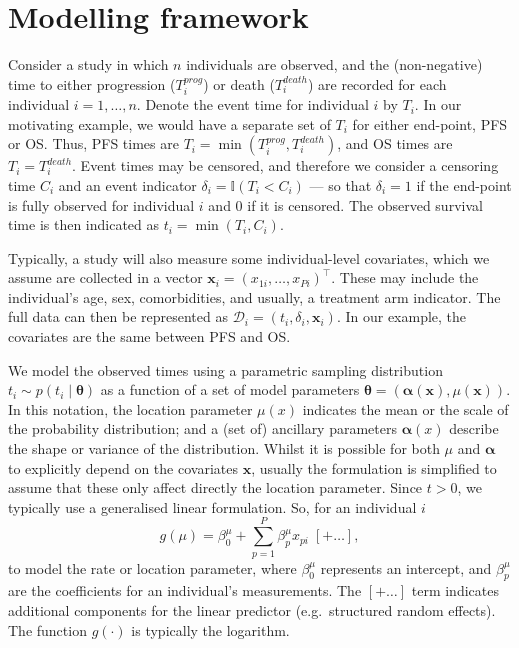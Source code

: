 \documentclass[AMA,STIX1COL]{WileyNJD-v2}
\begin{document}
\section{Modelling framework}\label{sec:methods}
Consider a study in which $n$ individuals are observed, and the (non-negative) time to either progression ($T^{prog}_{i}$) or death ($T^{death}_{i}$) are recorded for each individual $i=1,\ldots,n$.
Denote the event time for individual $i$ by $T_{i}$.
In our motivating example, we would have a separate set of $T_{i}$ for either end-point, PFS or OS.
Thus, PFS times are $T_{i} = \min(T^{prog}_{i}, T^{death}_{i})$, and OS times are $T_{i} = T^{death}_{i}$.
Event times may be censored, and therefore we consider a censoring time $C_{i}$ and an event indicator $\delta_{i} = \mathbb{I}(T_{i} < C_{i})$
--- so that $\delta_{i} = 1$ if the end-point is fully observed for individual $i$ and 0 if it is censored.
The observed survival time is then indicated as $t_{i} = \min(T_{i}, C_{i})$.

Typically, a study will also measure some individual-level covariates, which we assume are collected in a vector $\bm{x}_{i} = (x_{1i}, \ldots, x_{Pi})^\top$.
These may include the individual's age, sex, comorbidities, and usually, a treatment arm indicator.
The full data can then be represented as
$\mathcal{D}_i = (t_i, \delta_i, \bm{x}_i)$.
In our example, the covariates are the same between PFS and OS.

We model the observed times using a parametric sampling distribution $t_{i} \sim p(t_{i} \mid \bm\theta)$ as a function of a set of model parameters $\bm\theta = (\bm\alpha(\bm x), \mu(\bm x))$. 
In this notation, the location parameter $\mu(x)$ indicates the mean or the scale of the probability distribution; and a (set of) ancillary parameters $\bm \alpha(x)$ describe the shape or variance of the distribution.
Whilst it is possible for both $\mu$ and $\bm\alpha$ to explicitly depend on the covariates $\bm x$, usually the formulation is simplified to assume that these only affect directly the location parameter.
Since $t>0$, we typically use a generalised linear formulation.
So, for an individual $i$
$$
g(\mu) = \beta^{\mu}_{0} + \sum_{p=1}^P \beta^{\mu}_{p} x_{pi} \; [+ \ldots ],
$$
to model the rate or location parameter,
where $\beta^{\mu}_{0}$ represents an intercept,
and $\beta^{\mu}_{p}$ are the coefficients for an individual's measurements.
The $[+ \ldots]$ term indicates additional components for the linear predictor (e.g.~structured random effects).
The function $g(\cdot)$ is typically the logarithm.
\end{document}
